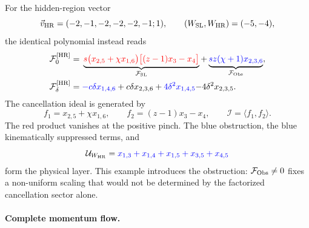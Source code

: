 \documentclass[a4paper,11pt]{article}
\newcommand{\HR}{\mathrm{HR}}
\newcommand{\FSL}{\mathcal F_{\rm SL}}
\newcommand{\FObs}{\mathcal F_{\rm Obs}}
\newcommand{\WSL}{W_{\rm SL}}
\newcommand{\WHR}{W_{\rm HR}}
\newcommand{\vHR}{\vec v_{\rm HR}}
\newcommand{\ideal}{\mathcal I}
\newcommand{\SLcolour}[1]{{\color{red}#1}}
\newcommand{\HRcolour}[1]{{\color{blue}#1}}
\newcommand{\Othercolour}[1]{{\color{black}#1}}
\begin{document}
For the hidden-region vector
\begin{equation}
 \vHR=(-2,-1,-2,-2,-2,-1;1),
 \qquad (\WSL,\WHR)=(-5,-4),
 \label{eq:five-HR-vector}
\end{equation}
the identical polynomial instead reads
\begin{align}
 \mathcal F_0^{[\HR]}={}&
 \underbrace{\SLcolour{s\bigl(x_{2,5}+\chi x_{1,6}\bigr)
       \bigl[(z-1)x_3-x_4\bigr]}}_{\FSL}
 +\underbrace{\HRcolour{sz(\chi+1)x_{2,3,6}}}_{\FObs},
 \label{eq:five-HR-F0}\\
 \mathcal F_\delta^{[\HR]}={}&
 \HRcolour{-c\delta x_{1,4,6}}
 +\Othercolour{c\delta x_{2,3,6}}
 +\HRcolour{4\delta^2x_{1,4,5}}
 \Othercolour{-4\delta^2x_{2,3,5}}.
 \label{eq:five-HR-Fdelta}
\end{align}
The cancellation ideal is generated by
\begin{equation}
 f_1=x_{2,5}+\chi x_{1,6},\qquad
 f_2=(z-1)x_3-x_4,\qquad \ideal=\langle f_1,f_2\rangle.
 \label{eq:five-generator}
\end{equation}
The red product vanishes at the positive pinch.  The blue obstruction,
the blue kinematically suppressed terms, and
\begin{equation}
 \mathcal U_{\WHR}
 =\HRcolour{x_{1,3}+x_{1,4}+x_{1,5}+x_{3,5}+x_{4,5}}
 \label{eq:five-U-leading}
\end{equation}
form the physical layer.  This example introduces the obstruction:
\(\FObs\ne0\) fixes a non-uniform scaling that would not be determined by
the factorized cancellation sector alone.

\paragraph{Complete momentum flow.}
\end{document}
